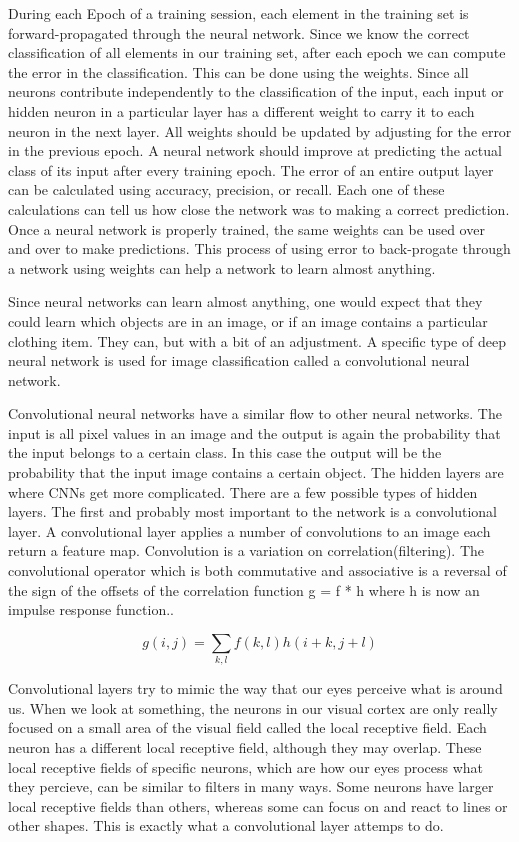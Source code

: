\documentclass[12pt]{article} %
\begin{document}
During each Epoch of a training session, each element in the training set is forward-propagated through the neural network. Since we know the correct classification of all elements in our training set, after each epoch we can compute the error in the classification. This can be done using the weights. Since all neurons contribute independently to the classification of the input, each input or hidden neuron in a particular layer has a different weight to carry it to each neuron in the next layer. All weights should be updated by adjusting for the error in the previous epoch. A neural network should improve at predicting the actual class of its input after every training epoch. The error of an entire output layer can be calculated using accuracy, precision, or recall. Each one of these calculations can tell us how close the network was to making a correct prediction. Once a neural network is properly trained, the same weights can be used over and over to make predictions. This process of using error to back-progate through a network using weights can help a network to learn almost anything.\cite{KubatMachineLearn} 
	
	Since neural networks can learn almost anything, one would expect that they could learn which objects are in an image, or if an image contains a particular clothing item. They can, but with a bit of an adjustment. A specific type of deep neural network is used for image classification called a convolutional neural network. 

	Convolutional neural networks have a similar flow to other neural networks. The input is all pixel values in an image and the output is again the probability that the input belongs to a certain class. In this case the output will be the probability that the input image contains a certain object. The hidden layers are where CNNs get more complicated. There are a few possible types of hidden layers. The first and probably most important to the network is a convolutional layer. A convolutional layer applies a number of convolutions to an image each return a feature map\cite{aurelienMachineLearning}. Convolution is a variation on correlation(filtering). The convolutional operator which is both commutative and associative is a reversal of the sign of the offsets of the correlation function  g = f * h where h is now an impulse response function.\cite{szeliski2010computer}. 

\[g(i,j) = \sum_{k,l} f(k, l)h(i + k, j + l)\]

	Convolutional layers try to mimic the way that our eyes perceive what is around us. When we look at something, the neurons in our visual cortex are only really focused on a small area of the visual field called the local receptive field. Each neuron has a different local receptive field, although they may overlap. These local receptive fields of specific neurons, which are how our eyes process what they percieve, can be similar to filters in many ways. Some neurons have larger local receptive fields than others, whereas some can focus on and react to lines or other shapes. This is exactly what a convolutional layer attemps to do.\cite{aurelienMachineLearning} 
	
\end{document}
